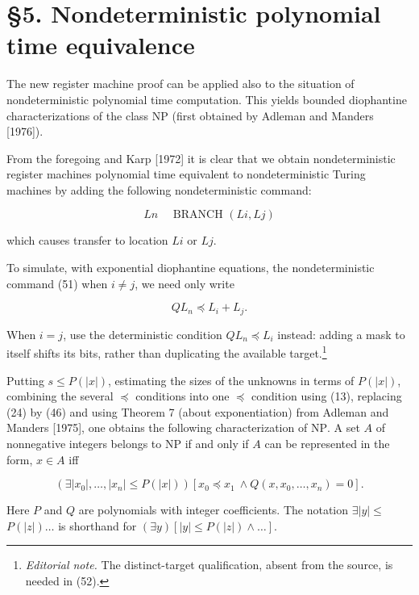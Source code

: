 \documentclass[11pt,leqno]{article}
\newcommand{\ednote}[1]{\footnote{\textit{Editorial note.} #1}}
\begin{document}
\section*{\S5. Nondeterministic polynomial time equivalence} The new register machine proof can be applied also to the situation of nondeterministic polynomial time computation. This yields bounded diophantine characterizations of the class $\mathrm{NP}$ (first obtained by Adleman and Manders [1976]).

From the foregoing and Karp [1972] it is clear that we obtain nondeterministic register machines polynomial time equivalent to nondeterministic Turing machines by adding the following nondeterministic command:

\begin{equation*}
L n \quad \text { BRANCH }(L i, L j) \tag{51}\label{eq:51}
\end{equation*}

which causes transfer to location $L i$ or $L j$.

To simulate, with exponential diophantine equations, the nondeterministic command (51) when $i\neq j$, we need only write

\begin{equation*}
Q L_{n} \preccurlyeq L_{i}+L_{j} . \tag{52}\label{eq:52}
\end{equation*}

When $i=j$, use the deterministic condition $Q L_n\preccurlyeq L_i$ instead: adding a mask to itself shifts its bits, rather than duplicating the available target.\ednote{The distinct-target qualification, absent from the source, is needed in (52).}

Putting $s\leq P(|x|)$, estimating the sizes of the unknowns in terms of $P(|x|)$, combining the several $\preccurlyeq$ conditions into one $\preccurlyeq$ condition using (13), replacing (24) by (46) and using Theorem 7 (about exponentiation) from Adleman and Manders [1975], one obtains the following characterization of $\mathrm{NP}$. A set $A$ of nonnegative integers belongs to $\mathrm{NP}$ if and only if $A$ can be represented in the form, $x \in A$ iff

\begin{equation*}
\left(\exists\left|x_{0}\right|, \ldots,\left|x_{n}\right| \leq P(|x|)\right)\left[x_{0}\preccurlyeq x_{1}\ \land Q\left(x, x_{0}, \ldots, x_{n}\right)=0\right] . \tag{53}\label{eq:53}
\end{equation*}

Here $P$ and $Q$ are polynomials with integer coefficients. The notation $\exists|y| \leq$ $P(|z|) \ldots$ is shorthand for $(\exists y)[|y| \leq P(|z|)\land \ldots]$.
\end{document}
